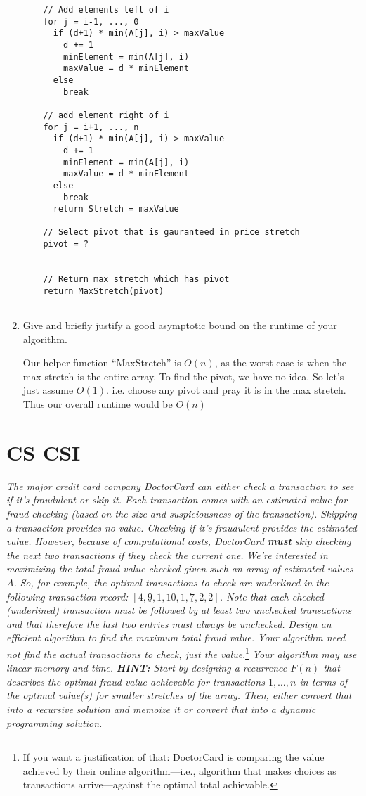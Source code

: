 \documentclass[11pt, oneside]{article}   	%
\theoremstyle{definition}
\theoremstyle{remark}
\begin{document}
\begin{enumerate}
\begin{verbatim}
    // Add elements left of i
    for j = i-1, ..., 0
      if (d+1) * min(A[j], i) > maxValue
        d += 1
        minElement = min(A[j], i)
        maxValue = d * minElement
      else
        break
        
    // add element right of i
    for j = i+1, ..., n
      if (d+1) * min(A[j], i) > maxValue
        d += 1
        minElement = min(A[j], i)
        maxValue = d * minElement
      else
        break   
      return Stretch = maxValue  
    
    // Select pivot that is gauranteed in price stretch
    pivot = ?
    
    
    // Return max stretch which has pivot
    return MaxStretch(pivot)
    

\end{verbatim}
\item Give and briefly justify a good asymptotic bound on the runtime of
   your algorithm.
   
   Our helper function ``MaxStretch'' is $O(n)$, as the worst case is when the max stretch is the entire array. To find the pivot, we have no idea. So let's just assume $O(1)$. i.e. choose any pivot and pray it is in the max stretch. Thus our overall runtime would be $O(n)$
\end{enumerate}


\cleardoublepage
\section{CS CSI}
\label{sec-2}
\textit{The major credit card company DoctorCard can either check a transaction to see if it's fraudulent or skip it. Each transaction comes with an estimated value for fraud checking (based on the size and suspiciousness of the transaction). Skipping a transaction provides no value. Checking if it's fraudulent provides the estimated value. However, because of computational costs, DoctorCard \textbf{must} skip checking the next two transactions if they check the current one.}
\textit{We're interested in maximizing the total fraud value checked given such an array of estimated values $A$.}
\textit{So, for example, the optimal transactions to check are underlined in the following transaction record: $[4, \underline{9}, 1, 10, 1, \underline{7}, 2, 2]$. Note that each checked (underlined) transaction must be followed by at least two unchecked transactions and that therefore the last two entries must always be unchecked.}
\textit{Design an efficient algorithm to find the maximum total fraud
value. Your algorithm need not find the actual transactions to check, just the value}.\footnote{If you want a justification of that: DoctorCard is comparing the value achieved by their online algorithm---i.e., algorithm that makes choices as transactions arrive---against the optimal total achievable.} \textit{Your algorithm may use linear memory and time.}
\textit{\textbf{HINT:} Start by designing a recurrence $F(n)$ that describes the optimal fraud value achievable for transactions $1,\ldots,n$ in terms of the optimal value(s) for smaller stretches of the array. Then,
either convert that into a recursive solution and memoize it or convert that into a dynamic programming solution.}
\end{document}
